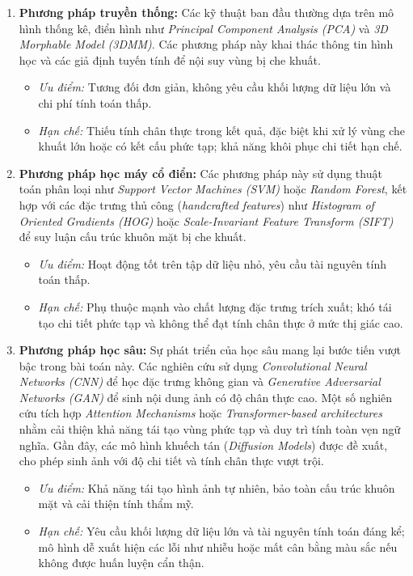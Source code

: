 \documentclass[12pt,a4paper]{article}
\begin{document}
	\begin{enumerate}
		\item \textbf{Phương pháp truyền thống:} 
		Các kỹ thuật ban đầu thường dựa trên mô hình thống kê, điển hình như \textit{Principal Component Analysis (PCA)} và \textit{3D Morphable Model (3DMM)}. Các phương pháp này khai thác thông tin hình học và các giả định tuyến tính để nội suy vùng bị che khuất. 
		\begin{itemize}
			\item \textit{Ưu điểm:} Tương đối đơn giản, không yêu cầu khối lượng dữ liệu lớn và chi phí tính toán thấp. 
			\item \textit{Hạn chế:} Thiếu tính chân thực trong kết quả, đặc biệt khi xử lý vùng che khuất lớn hoặc có kết cấu phức tạp; khả năng khôi phục chi tiết hạn chế.
		\end{itemize}
			
		\item \textbf{Phương pháp học máy cổ điển:} 
		Các phương pháp này sử dụng thuật toán phân loại như \textit{Support Vector Machines (SVM)} hoặc \textit{Random Forest}, kết hợp với các đặc trưng thủ công (\textit{handcrafted features}) như \textit{Histogram of Oriented Gradients (HOG)} hoặc \textit{Scale-Invariant Feature Transform (SIFT)} để suy luận cấu trúc khuôn mặt bị che khuất. 
		\begin{itemize}
			\item \textit{Ưu điểm:} Hoạt động tốt trên tập dữ liệu nhỏ, yêu cầu tài nguyên tính toán thấp.
			\item \textit{Hạn chế:} Phụ thuộc mạnh vào chất lượng đặc trưng trích xuất; khó tái tạo chi tiết phức tạp và không thể đạt tính chân thực ở mức thị giác cao.
		\end{itemize}
		
		\item \textbf{Phương pháp học sâu:} 
		Sự phát triển của học sâu mang lại bước tiến vượt bậc trong bài toán này. Các nghiên cứu sử dụng \textit{Convolutional Neural Networks (CNN)} để học đặc trưng không gian và \textit{Generative Adversarial Networks (GAN)} để sinh nội dung ảnh có độ chân thực cao. Một số nghiên cứu tích hợp \textit{Attention Mechanisms} hoặc \textit{Transformer-based architectures} nhằm cải thiện khả năng tái tạo vùng phức tạp và duy trì tính toàn vẹn ngữ nghĩa. Gần đây, các mô hình khuếch tán (\textit{Diffusion Models}) được đề xuất, cho phép sinh ảnh với độ chi tiết và tính chân thực vượt trội.
		\begin{itemize}
			\item \textit{Ưu điểm:} Khả năng tái tạo hình ảnh tự nhiên, bảo toàn cấu trúc khuôn mặt và cải thiện tính thẩm mỹ.
			\item \textit{Hạn chế:} Yêu cầu khối lượng dữ liệu lớn và tài nguyên tính toán đáng kể; mô hình dễ xuất hiện các lỗi như nhiễu hoặc mất cân bằng màu sắc nếu không được huấn luyện cẩn thận.
		\end{itemize}
		 
	\end{enumerate}
	
\end{document}
